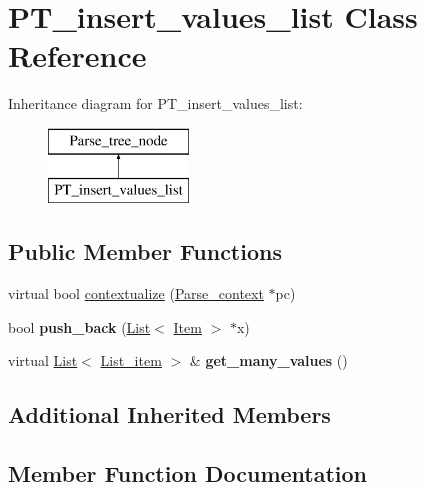 \hypertarget{classPT__insert__values__list}{}\section{P\+T\+\_\+insert\+\_\+values\+\_\+list Class Reference}
\label{classPT__insert__values__list}
Inheritance diagram for P\+T\+\_\+insert\+\_\+values\+\_\+list\+:\begin{figure}[H]
\begin{center}
\leavevmode
\includegraphics[height=2.000000cm]{classPT__insert__values__list}
\end{center}
\end{figure}
\subsection*{Public Member Functions}
\begin{DoxyCompactItemize}
\item 
virtual bool \mbox{\hyperlink{classPT__insert__values__list_ab71ca9567e43cd73f7b4cc4782607217}{contextualize}} (\mbox{\hyperlink{structParse__context}{Parse\+\_\+context}} $\ast$pc)
\item 
\mbox{\label{classPT__insert__values__list_ab67ab2afd76e7b035448842b8afa33c7}} 
bool {\bfseries push\+\_\+back} (\mbox{\hyperlink{classList}{List}}$<$ \mbox{\hyperlink{classItem}{Item}} $>$ $\ast$x)
\item 
\mbox{\label{classPT__insert__values__list_a5bb142321634d3799fb2c7aba4ba788f}} 
virtual \mbox{\hyperlink{classList}{List}}$<$ \mbox{\hyperlink{classList}{List\+\_\+item}} $>$ \& {\bfseries get\+\_\+many\+\_\+values} ()
\end{DoxyCompactItemize}
\subsection*{Additional Inherited Members}


\subsection{Member Function Documentation}
\mbox{\label{classPT__insert__values__list_ab71ca9567e43cd73f7b4cc4782607217}} 
